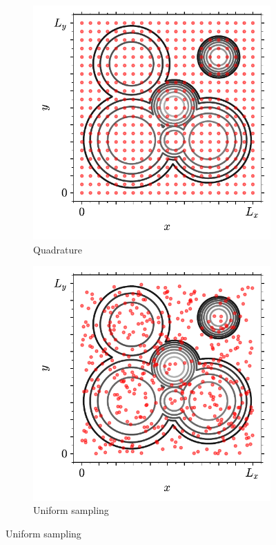 \begin{figure}[btp]
     \centering
     
     \begin{subfigure}[b]{0.45\textwidth}
         \centering
         \includegraphics[width=\textwidth]{./figures/methods/mc_2d_quad.pdf}
         \caption{Quadrature}
         \label{fig:montecarloint1}
     \end{subfigure}
     \hfill
     \begin{subfigure}[b]{0.45\textwidth}
         \centering
         \includegraphics[width=\textwidth]{./figures/methods/mc_2d_rand.pdf}
         \caption{Uniform sampling}
         \label{fig:montecarloint2}
     \end{subfigure}
     \hfill
     

\end{figure}

